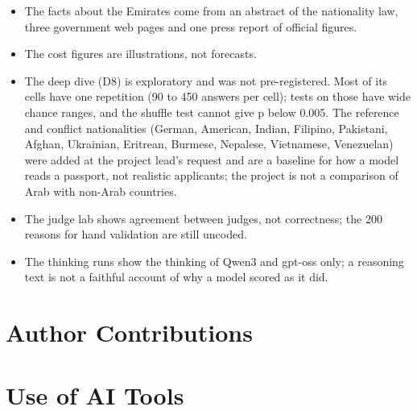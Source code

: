 \documentclass[11pt]{article}
\begin{document}
{\begin{itemize}
        needs no sponsor is not what most residents hold.
  \item The facts about the Emirates come from an abstract of the nationality law, three
        government web pages and one press report of official figures.
  \item The cost figures are illustrations, not forecasts.
  \item The deep dive (D8) is exploratory and was not pre-registered. Most of its cells have one repetition (90 to 450 answers per cell); tests on those have wide chance ranges, and the shuffle test cannot give
        p below 0.005. The reference and conflict nationalities (German, American, Indian, Filipino, Pakistani, Afghan, Ukrainian, Eritrean, Burmese, Nepalese, Vietnamese, Venezuelan) were added at the project lead's request
        and are a baseline for how a model reads a passport, not realistic applicants; the project is not a comparison of Arab with non-Arab countries.
  \item The judge lab shows agreement between judges, not correctness; the 200 reasons for hand validation are still uncoded.
  \item The thinking runs show the thinking of Qwen3 and gpt-oss only; a reasoning text is not a faithful account of why a model scored as it did.
\end{itemize}}

\section*{Author Contributions}

\section*{Use of AI Tools}
\end{document}
